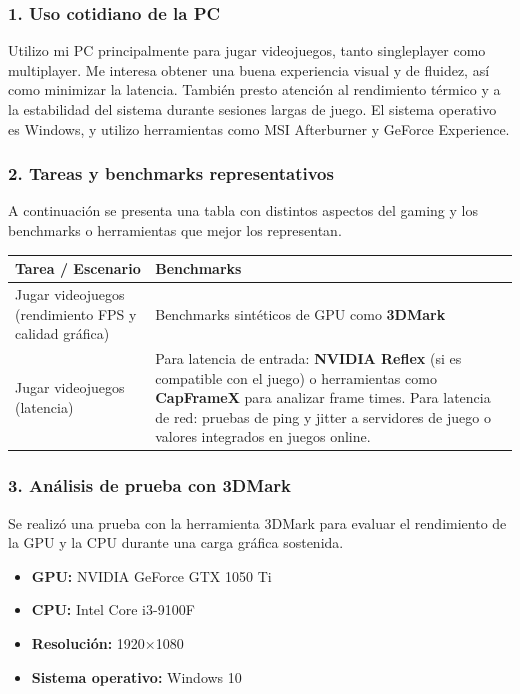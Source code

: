 
\subsubsection*{1. Uso cotidiano de la PC}
Utilizo mi PC principalmente para jugar videojuegos, tanto singleplayer como multiplayer. Me interesa obtener una buena experiencia visual y de fluidez, así como minimizar la latencia. También presto atención al rendimiento térmico y a la estabilidad del sistema durante sesiones largas de juego. El sistema operativo es Windows, y utilizo herramientas como MSI Afterburner y GeForce Experience.

\subsubsection*{2. Tareas y benchmarks representativos}

A continuación se presenta una tabla con distintos aspectos del gaming y los benchmarks o herramientas que mejor los representan.

\begin{center}
\begin{tabular}{|p{7cm}|p{7cm}|}
\hline
\textbf{Tarea / Escenario} & \textbf{Benchmarks} \\
\hline
Jugar videojuegos (rendimiento FPS y calidad gráfica) & Benchmarks sintéticos de GPU como \textbf{3DMark} \\
\hline
Jugar videojuegos (latencia) & Para latencia de entrada: \textbf{NVIDIA Reflex} (si es compatible con el juego) o herramientas como \textbf{CapFrameX} para analizar frame times. Para latencia de red: pruebas de ping y jitter a servidores de juego o valores integrados en juegos online. \\
\hline
\end{tabular}
\end{center}

\subsubsection*{3. Análisis de prueba con 3DMark}

Se realizó una prueba con la herramienta 3DMark para evaluar el rendimiento de la GPU y la CPU durante una carga gráfica sostenida.

\begin{itemize}
  \item \textbf{GPU:} NVIDIA GeForce GTX 1050 Ti
  \item \textbf{CPU:} Intel Core i3-9100F
  \item \textbf{Resolución:} 1920×1080
  \item \textbf{Sistema operativo:} Windows 10
\end{itemize}

